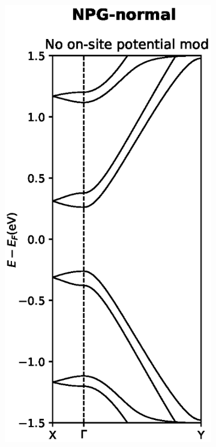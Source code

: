 \begin{figure}[h]
	\centering
	\begin{subfigure}[b]{0.3\textwidth}
		\includegraphics[width=\textwidth]{Figures/FabNPGBS.eps}

\end{subfigure}
\end{figure}
